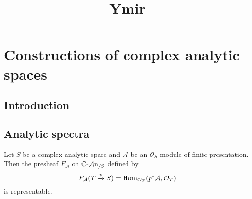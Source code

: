 
\title{Ymir}

\maketitle
\tableofcontents

\chapter*{Constructions of complex analytic spaces}\label{chap-constructionComplex}

\section{Introduction}\label{sec-introduction-constructioncomplex}

\section{Analytic spectra}

\begin{proposition}\label{prop-analyticspecrep}
    Let $S$ be a complex analytic space and $\mathcal{A}$ be an $\mathcal{O}_S$-module of finite presentation. Then the presheaf $F_{\mathcal{A}}$ on $\mathbb{C}\text{-}\mathcal{A}\mathrm{n}_{/S}$ defined by
    \[
        F_{\mathcal{A}}(T\xrightarrow{p} S)=\operatorname{Hom}_{\mathcal{O}_T}(p^*\mathcal{A},\mathcal{O}_T)  
    \]
    is representable.
\end{proposition}


